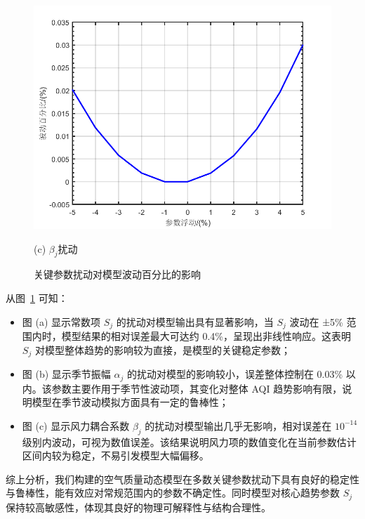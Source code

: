 \documentclass[a4paper,12pt]{article}
\begin{document}
\begin{figure}[htbp]
		\begin{minipage}[t]{0.32\textwidth}
			\centering
			\includegraphics[width=\textwidth]{canshu3.png}
			\caption*{(c) $\beta_j$扰动}
		\end{minipage}
		\caption{关键参数扰动对模型波动百分比的影响}
		\label{fig:sensitivity_row}
	\end{figure}
	
	从图~\ref{fig:sensitivity_row} 可知：
	
	\begin{itemize}
		\item 图 (a) 显示常数项 $S_j$ 的扰动对模型输出具有显著影响，当 $S_j$ 波动在 ±5\% 范围内时，模型结果的相对误差最大可达约 0.4\%，呈现出非线性响应。这表明 $S_j$ 对模型整体趋势的影响较为直接，是模型的关键稳定参数；
		
		\item 图 (b) 显示季节振幅 $\alpha_j$ 的扰动对模型的影响较小，误差整体控制在 0.03\% 以内。该参数主要作用于季节性波动项，其变化对整体 AQI 趋势影响有限，说明模型在季节波动模拟方面具有一定的鲁棒性；
		
		\item 图 (c) 显示风力耦合系数 $\beta_j$ 的扰动对模型输出几乎无影响，相对误差在 $10^{-14}$ 级别内波动，可视为数值误差。该结果说明风力项的数值变化在当前参数估计区间内较为稳定，不易引发模型大幅偏移。
	\end{itemize}
	
	综上分析，我们构建的空气质量动态模型在多数关键参数扰动下具有良好的稳定性与鲁棒性，能有效应对常规范围内的参数不确定性。同时模型对核心趋势参数 $S_j$ 保持较高敏感性，体现其良好的物理可解释性与结构合理性。
\end{document}
